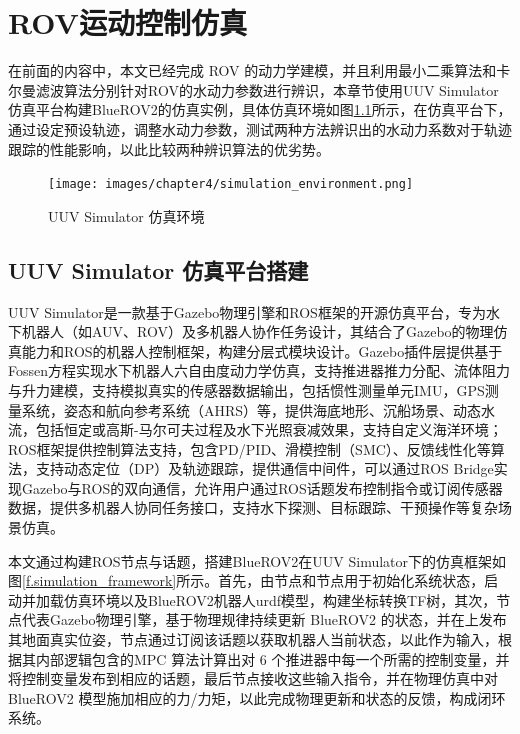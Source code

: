 \chapter{ROV运动控制仿真}
在前面的内容中，本文已经完成 ROV 的动力学建模，并且利用最小二乘算法和卡尔曼滤波算法分别针对ROV的水动力参数进行辨识，本章节使用UUV Simulator仿真平台\cite{Manhaes_2016}构建BlueROV2的仿真实例，具体仿真环境如图\ref{f.simulation_environment}所示，在仿真平台下，通过设定预设轨迹，调整水动力参数，测试两种方法辨识出的水动力系数对于轨迹跟踪的性能影响，以此比较两种辨识算法的优劣势。

\begin{figure}[hbt]
    \centering
    \texttt{[image: images/chapter4/simulation\_environment.png]}
    \caption{UUV Simulator 仿真环境}
    \label{f.simulation_environment}
\end{figure}

\section{UUV Simulator 仿真平台搭建}

UUV Simulator是一款基于Gazebo物理引擎和ROS框架的开源仿真平台，专为水下机器人（如AUV、ROV）及多机器人协作任务设计，其结合了Gazebo的物理仿真能力和ROS的机器人控制框架，构建分层式模块设计。Gazebo插件层提供基于Fossen方程实现水下机器人六自由度动力学仿真，支持推进器推力分配、流体阻力与升力建模，支持模拟真实的传感器数据输出，包括惯性测量单元IMU，GPS测量系统，姿态和航向参考系统（AHRS）等，提供海底地形、沉船场景、动态水流，包括恒定或高斯-马尔可夫过程及水下光照衰减效果，支持自定义海洋环境；ROS框架提供控制算法支持，包含PD/PID、滑模控制（SMC）、反馈线性化等算法，支持动态定位（DP）及轨迹跟踪，提供通信中间件，可以通过ROS Bridge实现Gazebo与ROS的双向通信，允许用户通过ROS话题发布控制指令或订阅传感器数据，提供多机器人协同任务接口，支持水下探测、目标跟踪、干预操作等复杂场景仿真。

本文通过构建ROS节点与话题，搭建BlueROV2在UUV Simulator下的仿真框架如图\ref{f.simulation_framework}所示。首先，由节点和节点用于初始化系统状态，启动并加载仿真环境以及BlueROV2机器人urdf模型，构建坐标转换TF树，其次，节点代表Gazebo物理引擎，基于物理规律持续更新 BlueROV2 的状态，并在上发布其地面真实位姿，节点通过订阅该话题以获取机器人当前状态，以此作为输入，根据其内部逻辑包含的MPC 算法计算出对 6 个推进器中每一个所需的控制变量，并将控制变量发布到相应的话题，最后节点接收这些输入指令，并在物理仿真中对 BlueROV2 模型施加相应的力/力矩，以此完成物理更新和状态的反馈，构成闭环系统。

